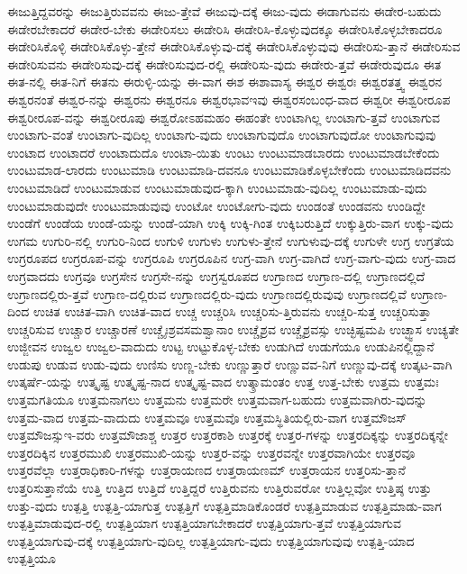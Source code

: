 {ಈಜುತ್ತಿದ್ದವರನ್ನು
ಈಜುತ್ತಿರುವವನು
ಈಜು-ತ್ತೇವೆ
ಈಜುವು-ದಕ್ಕೆ
ಈಜು-ವುದು
ಈಡಾಗುವನು
ಈಡೇರ-ಬಹುದು
ಈಡೇರಬೇಕಾದರೆ
ಈಡೇರ-ಬೇಕು
ಈಡೇರಿಸಲು
ಈಡೇರಿಸಿ
ಈಡೇರಿಸಿ-ಕೊಳ್ಳುವುದಕ್ಕೂ
ಈಡೇರಿಸಿಕೊಳ್ಳಬೇಕಾದರೂ
ಈಡೇರಿಸಿಕೊಳ್ಳಿ
ಈಡೇರಿಸಿಕೊಳ್ಳು-ತ್ತೇನೆ
ಈಡೇರಿಸಿಕೊಳ್ಳುವು-ದಕ್ಕೆ
ಈಡೇರಿಸಿಕೊಳ್ಳುವುವು
ಈಡೇರಿಸು-ತ್ತಾನೆ
ಈಡೇರಿಸುವ
ಈಡೇರಿಸುವನು
ಈಡೇರಿಸುವು-ದಕ್ಕೆ
ಈಡೇರಿಸುವುದ-ರಲ್ಲಿ
ಈಡೇರಿಸು-ವುದು
ಈಡೇರು-ತ್ತವೆ
ಈಡೇರುವುದೂ
ಈತ
ಈತ-ನಲ್ಲಿ
ಈತ-ನಿಗೆ
ಈತನು
ಈರುಳ್ಳಿ-ಯನ್ನು
ಈ-ವಾಗ
ಈಶ
ಈಶಾವಾಸ್ಯ
ಈಶ್ವರ
ಈಶ್ವರಃ
ಈಶ್ವರತತ್ತ್ವ
ಈಶ್ವರನ
ಈಶ್ವರನಂತೆ
ಈಶ್ವರ-ನನ್ನು
ಈಶ್ವರನು
ಈಶ್ವರನೂ
ಈಶ್ವರಭಾವಇವು
ಈಶ್ವರಸಂಬಂಧ-ವಾದ
ಈಶ್ವರೀ
ಈಶ್ವರೀರೂಪ
ಈಶ್ವರೀರೂಪ-ವನ್ನು
ಈಶ್ವರೀರೂಪು
ಈಶ್ವರೋಽಹಮಹಂ
ಈಹಂತೇ
ಉಂಟಾಗಿಲ್ಲ
ಉಂಟಾಗು-ತ್ತವೆ
ಉಂಟಾಗುವ
ಉಂಟಾಗು-ವಂತೆ
ಉಂಟಾಗು-ವುದಿಲ್ಲ
ಉಂಟಾಗು-ವುದು
ಉಂಟಾಗುವುದೊ
ಉಂಟಾಗುವುದೋ
ಉಂಟಾಗುವುವು
ಉಂಟಾದ
ಉಂಟಾದರೆ
ಉಂಟಾದುದೊ
ಉಂಟಾ-ಯಿತು
ಉಂಟು
ಉಂಟುಮಾಡಬಾರದು
ಉಂಟುಮಾಡಬೇಕೆಂದು
ಉಂಟುಮಾಡ-ಲಾರದು
ಉಂಟುಮಾಡಿ
ಉಂಟುಮಾಡಿ-ದವನೂ
ಉಂಟುಮಾಡಿಕೊಳ್ಳಬೇಕೆಂದು
ಉಂಟುಮಾಡಿದವನು
ಉಂಟುಮಾಡಿದೆ
ಉಂಟುಮಾಡುವ
ಉಂಟುಮಾಡುವುದ-ಕ್ಕಾಗಿ
ಉಂಟುಮಾಡು-ವುದಿಲ್ಲ
ಉಂಟುಮಾಡು-ವುದು
ಉಂಟುಮಾಡುವುದೇ
ಉಂಟುಮಾಡುವುವು
ಉಂಟೋ
ಉಂಟೋಗು-ವುದು
ಉಂಡಂತೆ
ಉಂಡವನು
ಉಂಡಿದ್ದೇ
ಉಂಡೆಗೆ
ಉಂಡೆಯ
ಉಂಡೆ-ಯನ್ನು
ಉಂಡೆ-ಯಾಗಿ
ಉಕ್ಕಿ
ಉಕ್ಕಿ-ಗಿಂತ
ಉಕ್ಕಿಬರುತ್ತಿದೆ
ಉಕ್ಕುತ್ತಿರು-ವಾಗ
ಉಕ್ಕು-ವುದು
ಉಗಮ
ಉಗುರಿ-ನಲ್ಲಿ
ಉಗುರಿ-ನಿಂದ
ಉಗುಳಿ
ಉಗುಳು
ಉಗುಳು-ತ್ತೇನೆ
ಉಗುಳುವು-ದಕ್ಕೆ
ಉಗುಳೇ
ಉಗ್ರ
ಉಗ್ರತೆಯ
ಉಗ್ರರೂಪದ
ಉಗ್ರರೂಪ-ವನ್ನು
ಉಗ್ರರೂಪಿ
ಉಗ್ರರೂಪಿನ
ಉಗ್ರ-ವಾಗಿ
ಉಗ್ರ-ವಾಗಿದೆ
ಉಗ್ರ-ವಾಗು-ವುದು
ಉಗ್ರ-ವಾದ
ಉಗ್ರವಾದದು
ಉಗ್ರವೂ
ಉಗ್ರಸೇನ
ಉಗ್ರಸೇ-ನನ್ನು
ಉಗ್ರಸ್ವರೂಪದ
ಉಗ್ರಾಣದ
ಉಗ್ರಾಣ-ದಲ್ಲಿ
ಉಗ್ರಾಣದಲ್ಲಿದೆ
ಉಗ್ರಾಣದಲ್ಲಿರು-ತ್ತವೆ
ಉಗ್ರಾಣ-ದಲ್ಲಿರುವ
ಉಗ್ರಾಣದಲ್ಲಿರು-ವುದು
ಉಗ್ರಾಣದಲ್ಲಿರುವುವು
ಉಗ್ರಾಣದಲ್ಲಿವೆ
ಉಗ್ರಾಣ-ದಿಂದ
ಉಚಿತ
ಉಚಿತ-ವಾಗಿ
ಉಚಿತ-ವಾದ
ಉಚ್ಚ
ಉಚ್ಚರಿಸಿ
ಉಚ್ಚರಿಸು-ತ್ತಿರುವನು
ಉಚ್ಚರಿ-ಸುತ್ತ
ಉಚ್ಚರಿಸುತ್ತಾ
ಉಚ್ಚರಿಸುವ
ಉಚ್ಚಾರ
ಉಚ್ಚಾರಣೆ
ಉಚ್ಚೈಃಶ್ರವಸಮಶ್ವಾನಾಂ
ಉಚ್ಚೈಶ್ರವ
ಉಚ್ಚೈಶ್ರವಸ್ಸು
ಉಚ್ಛಿಷ್ಟಮಪಿ
ಉಚ್ಛ್ವಾಸ
ಉಚ್ಯತೇ
ಉಜ್ಜೀವನ
ಉಜ್ವಲ
ಉಜ್ವಲ-ವಾದುದು
ಉಟ್ಟ
ಉಟ್ಟುಕೊಳ್ಳ-ಬೇಕು
ಉಡುಗಿದೆ
ಉಡುಗೆಯೂ
ಉಡುಪಿನಲ್ಲಿದ್ದಾನೆ
ಉಡುಪು
ಉಡುವ
ಉಡು-ವುದು
ಉಣಿಸು
ಉಣ್ಣ-ಬೇಕು
ಉಣ್ಣುತ್ತಾರೆ
ಉಣ್ಣುವವ-ನಿಗೆ
ಉಣ್ಣುವು-ದಕ್ಕೆ
ಉತ್ಕಟ-ವಾಗಿ
ಉತ್ಕರ್ಷೆ-ಯನ್ನು
ಉತ್ಕೃಷ್ಟ
ಉತ್ಕೃಷ್ಟ-ನಾದ
ಉತ್ಕೃಷ್ಟ-ವಾದ
ಉತ್ಕ್ರಾಮಂತಂ
ಉತ್ತ
ಉತ್ತ-ಬೇಕು
ಉತ್ತಮ
ಉತ್ತಮಃ
ಉತ್ತಮಗತಿಯೂ
ಉತ್ತಮನಾಗಲು
ಉತ್ತಮನು
ಉತ್ತಮರೇ
ಉತ್ತಮವಾಗ-ಬಹುದು
ಉತ್ತಮವಾಗಿರು-ವುದನ್ನು
ಉತ್ತಮ-ವಾದ
ಉತ್ತಮ-ವಾದುದು
ಉತ್ತಮವೂ
ಉತ್ತಮವೊ
ಉತ್ತಮಸ್ಥಿತಿಯಲ್ಲಿರು-ವಾಗ
ಉತ್ತಮೌಜಸ್
ಉತ್ತಮೌಜಸ್ಸುಇ-ವರು
ಉತ್ತಮೌಜಾಶ್ಚ
ಉತ್ತರ
ಉತ್ತರಕಾಶಿ
ಉತ್ತರಕ್ಕೆ
ಉತ್ತರ-ಗಳನ್ನು
ಉತ್ತರದಿಕ್ಕನ್ನು
ಉತ್ತರದಿಕ್ಕನ್ನೇ
ಉತ್ತರದಿಕ್ಕಿನ
ಉತ್ತರಮುಖಿ
ಉತ್ತರಮುಖಿ-ಯನ್ನು
ಉತ್ತರ-ವನ್ನು
ಉತ್ತರವನ್ನೇ
ಉತ್ತರವಾಗಿಯೇ
ಉತ್ತರವೂ
ಉತ್ತರವೆಲ್ಲಾ
ಉತ್ತರಾಧಿಕಾರಿ-ಗಳನ್ನು
ಉತ್ತರಾಯಣದ
ಉತ್ತರಾಯಣಮ್
ಉತ್ತರಾಯನ
ಉತ್ತರಿಸು-ತ್ತಾನೆ
ಉತ್ತರಿಸುತ್ತಾನೆಯೆ
ಉತ್ತಿ
ಉತ್ತಿದ
ಉತ್ತಿದೆ
ಉತ್ತಿದ್ದರೆ
ಉತ್ತಿರುವನು
ಉತ್ತಿರುವರೋ
ಉತ್ತಿಲ್ಲವೋ
ಉತ್ತಿಷ್ಠ
ಉತ್ತು
ಉತ್ತು-ವುದು
ಉತ್ಪತ್ತಿ
ಉತ್ಪತ್ತಿ-ಯಾಗುತ್ತ
ಉತ್ಪತ್ತಿಗೆ
ಉತ್ಪತ್ತಿಮಾಡಿಕೊಂಡರೆ
ಉತ್ಪತ್ತಿಮಾಡುವ
ಉತ್ಪತ್ತಿಮಾಡು-ವಾಗ
ಉತ್ಪತ್ತಿಮಾಡುವುದ-ರಲ್ಲಿ
ಉತ್ಪತ್ತಿಯಾಗ
ಉತ್ಪತ್ತಿಯಾಗಬೇಕಾದರೆ
ಉತ್ಪತ್ತಿಯಾಗು-ತ್ತವೆ
ಉತ್ಪತ್ತಿಯಾಗುವ
ಉತ್ಪತ್ತಿಯಾಗುವು-ದಕ್ಕೆ
ಉತ್ಪತ್ತಿಯಾಗು-ವುದಿಲ್ಲ
ಉತ್ಪತ್ತಿಯಾಗು-ವುದು
ಉತ್ಪತ್ತಿಯಾಗುವುವು
ಉತ್ಪತ್ತಿ-ಯಾದ
ಉತ್ಪತ್ತಿಯೂ
}
